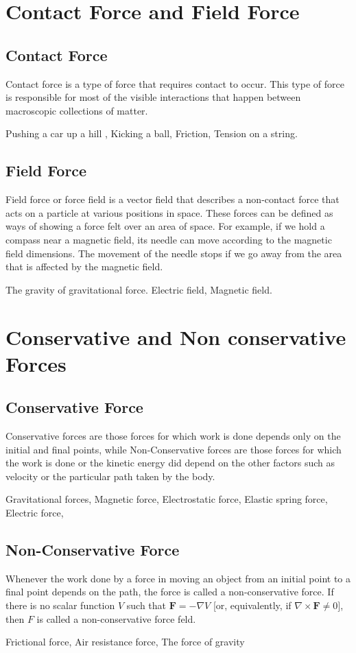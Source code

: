\section{Contact Force and Field Force}
\subsection{Contact Force}
Contact force is a type of force that requires contact to occur. This type of force is responsible for most of the visible interactions that happen between macroscopic collections of matter. 
\begin{example}
	Pushing a car up a hill , Kicking a ball, Friction, Tension on a string.
\end{example}
\subsection{Field Force}
Field force or force field is a vector field that describes a non-contact force that acts on a particle at various positions in space. These forces can be defined as ways of showing a force felt over an area of space. For example, if we hold a compass near a magnetic field, its needle can move according to the magnetic field dimensions. The movement of the needle stops if we go away from the area that is affected by the magnetic field.
\begin{example}
	The gravity of gravitational force. Electric field, Magnetic field.
\end{example}
\section{Conservative and Non conservative Forces}
\subsection{Conservative Force }
Conservative forces are those forces for which work is done depends only on the initial and final points, while Non-Conservative forces are those forces for which the work is done or the kinetic energy did depend on the other factors such as velocity or the particular path taken by the body.
\begin{example}
	Gravitational forces, Magnetic force, Electrostatic force, Elastic spring force, Electric force,
\end{example}
\subsection{Non-Conservative Force }
Whenever the work done by a force in moving an object from an initial point to a 
final point depends on the path, the force is called a non-conservative force. 
If there is no scalar function $V$ such that $\mathbf{F}=-\nabla V$ [or, equivalently, if $\nabla \times \mathbf{F} \neq 0]$, then $F$ is called a non-conservative force feld. 
\begin{example}
	Frictional force, Air resistance force, The force of gravity 
\end{example}
